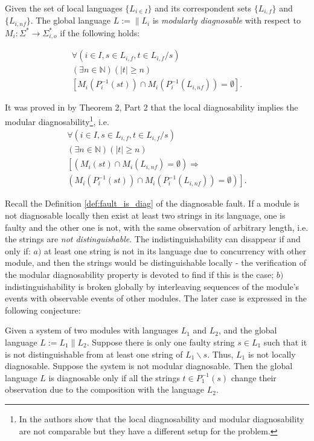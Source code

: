 \begin{definition} Given the set of local languages
$\{L_{i \in I}\}$ and its correspondent sets $\{L_{i,f}\}$ and
$\{L_{i,nf}\}$. The global language $L := \parallel L_i$ is \emph{modularly
diagnosable} with respect to
$M_i: \Sigma^* \rightarrow \Sigma_{i,o}^*$ 
if the following holds:
\end{definition}
\begin{equation}
\begin{array}{l}
	\forall(i \in I, s \in L_{i,f}, t \in L_{i,f}/s)
	\\
	(\exists n \in \mathbb{N})
	(|t| \geq n)
	\\
	\left[ M_i(P_i^{-1}(st)) \cap M_i(P_i^{-1}(L_{i,nf})) = \emptyset \right].
\end{array}
\end{equation}

It was proved in \cite{contant_diagnosability_2006} by Theorem 2, Part 2 
that the local diagnosability implies the modular diagnosability\footnote{In
\cite{zhou_decentralized_2008} the authors show that the local diagnosability
and modular diagnosability are not comparable but they have a different setup
for the problem.}, i.e.
\begin{equation}
\begin{array}{l}
	\forall(i \in I, s \in L_{i,f}, t \in L_{i,f}/s)
	\\
	(\exists n \in \mathbb{N})
	(|t| \geq n)
	\\
	\left[
	\left( M_i(st) \cap M_i(L_{i,nf}) = \emptyset \right)
	\Rightarrow \right.
	\\ 
	\left.
	\left( M_i(P_i^{-1}(st)) \cap M_i(P_i^{-1}(L_{i,nf})) = \emptyset \right)
	\right].
\end{array}
\end{equation}


Recall the Definition \ref{def:fault_is_diag} of the diagnosable fault. If a
module is not diagnosable locally then exist at least two strings in its
language, one is faulty and the other one is not, with the same observation of
arbitrary length, i.e. the strings are \emph{not distinguishable}. The
indistinguishability can disappear if and only if:
$a)$ at least one string is not in its language due to concurrency with other
module, and then the strings would be distinguishable locally - the verification
of the modular diagnosability property is devoted to find if this is the case;
$b)$ indistinguishability is broken globally by interleaving sequences of the
module's events with observable events of other modules. The later case is
expressed in the following conjecture:
\begin{conjecture} Given a system of two modules with languages $L_1$ and $L_2$,
and the global language $L := L_1 \parallel L_2$. Suppose there is only
one faulty string $s \in L_1$ such that it is not distinguishable from at least one
string of $L_1\backslash s$. Thus, $L_1$ is not locally diagnosable. Suppose the
system is not modular diagnosable. Then the global language $L$ is diagnosable
only if all the strings $t \in P_1^{-1}(s)$ change their observation due to 
the composition with the language $L_2$.
\end{conjecture}

